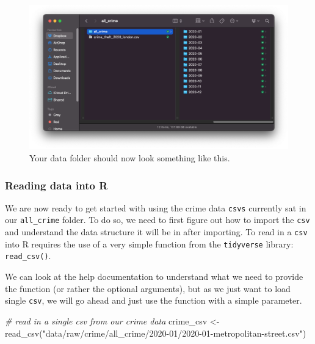 \documentclass[
]{book}
\newenvironment{Shaded}{\begin{snugshade}}{\end{snugshade}}
\newcommand{\CommentTok}[1]{\textcolor[rgb]{0.56,0.35,0.01}{\textit{#1}}}
\newcommand{\FunctionTok}[1]{\textcolor[rgb]{0.00,0.00,0.00}{#1}}
\newcommand{\NormalTok}[1]{#1}
\newcommand{\OtherTok}[1]{\textcolor[rgb]{0.56,0.35,0.01}{#1}}
\newcommand{\StringTok}[1]{\textcolor[rgb]{0.31,0.60,0.02}{#1}}
\begin{document}
\begin{figure}

{\centering \includegraphics[width=14.33in]{images/w04/organised-crime} 

}

\caption{Your data folder should now look something like this.}\label{fig:04-organised-crime}
\end{figure}

\hypertarget{reading-data-into-r}{%
\subsubsection{Reading data into R}\label{reading-data-into-r}}

We are now ready to get started with using the crime data \texttt{csv\textquotesingle{}s} currently sat in our \texttt{all\_crime} folder. To do so, we need to first figure out how to import the \texttt{csv} and understand the data structure it will be in after importing. To read in a \texttt{csv} into R requires the use of a very simple function from the \texttt{tidyverse} library: \texttt{read\_csv()}.

We can look at the help documentation to understand what we need to provide the function (or rather the optional arguments), but as we just want to load single \texttt{csv}, we will go ahead and just use the function with a simple parameter.

\begin{Shaded}
\begin{Highlighting}[]
\CommentTok{\# read in a single csv from our crime data}
\NormalTok{crime\_csv }\OtherTok{\textless{}{-}} \FunctionTok{read\_csv}\NormalTok{(}\StringTok{"data/raw/crime/all\_crime/2020{-}01/2020{-}01{-}metropolitan{-}street.csv"}\NormalTok{)}
\end{Highlighting}
\end{Shaded}
\end{document}
